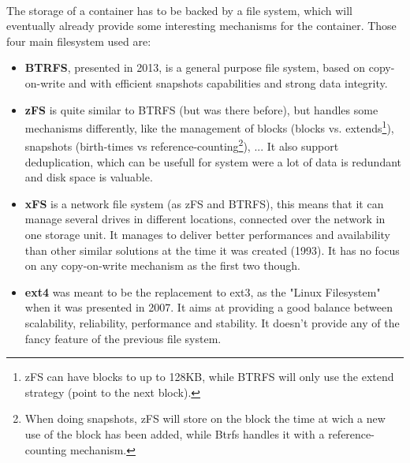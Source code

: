 \paragraph{}The storage of a container has to be backed by a file system, which will eventually already provide some interesting mechanisms for the container.  Those four main filesystem used are:
\begin{itemize}
\renewcommand\labelitemi{--}
  \item \textbf{BTRFS}, presented in 2013, \cite{rodeh2013btrfs} is a general purpose file system, based on copy-on-write and with efficient snapshots capabilities and strong data integrity.
  \item \textbf{zFS} is quite similar to BTRFS (but was there before), but handles some mechanisms differently, like the management of blocks (blocks vs. extends\footnote{zFS can have blocks to up to 128KB, while BTRFS will only use the extend strategy (point to the next block).}), snapshots (birth-times vs reference-counting\footnote{When doing snapshots, zFS will store on the block the time at wich a new use of the block has been added, while Btrfs handles it with a reference-counting mechanism.}), ...  It also support deduplication, which can be usefull for system were a lot of data is redundant and disk space is valuable.
  \item \textbf{xFS} is a network file system (as zFS and BTRFS), this means that it can manage several drives in different locations, connected over the network in one storage unit.  It manages to deliver better performances and availability than other similar solutions at the time it was created (1993).\cite{wang1993xfs}  It has no focus on any copy-on-write mechanism as the first two though.
  \item \textbf{ext4} was meant to be the replacement to ext3, as the "Linux Filesystem" when it was presented in 2007. \cite{mathur2007new}  It aims at providing a good balance between scalability, reliability, performance and stability.  It doesn't provide any of the fancy feature of the previous file system.
\end{itemize}

